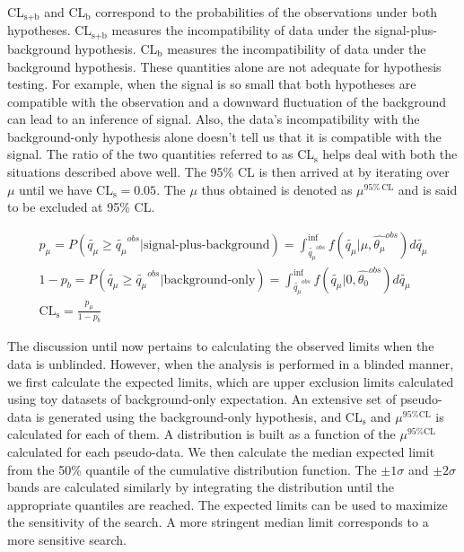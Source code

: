 CL$_\text{s+b}$ and CL$_\text{b}$ correspond to the probabilities of the observations under both hypotheses. CL$_\text{s+b}$ measures the incompatibility of data under the signal-plus-background hypothesis. CL$_\text{b}$ measures the incompatibility of data under the background hypothesis. These quantities alone are not adequate for hypothesis testing. For example, when the signal is so small that both hypotheses are compatible with the observation and a downward fluctuation of the background can lead to an inference of signal. Also, the data's incompatibility with the background-only hypothesis alone doesn't tell us that it is compatible with the signal. The ratio of the two quantities referred to as CL$_\text{s}$ helps deal with both the situations described above well. The 95\% CL is then arrived at by iterating over $\mu$ until we have CL$_\text{s}=0.05$. The $\mu$ thus obtained is denoted as $\mu^{95\% \, \text{CL}}$ and is said to be excluded at 95\% CL.

\begin{gather}
  p_\mu=P(\tilde{q_\mu}\geq \tilde{q_\mu}^{obs}|\text{signal-plus-background})=\int_{\tilde{q_\mu}^{obs}}^{\inf}f(\tilde{q_\mu}|\mu,\hat{\theta_\mu}^{obs})d\tilde{q_\mu} \\
  1-p_b=P(\tilde{q_\mu}\geq \tilde{q_\mu}^{obs}|\text{background-only})=\int_{\tilde{q_\mu}^{obs}}^{\inf}f(\tilde{q_\mu}|0,\hat{\theta_0}^{obs})d\tilde{q_\mu} \\
  \text{CL}_\text{s}=\frac{p_\mu}{1-p_b}
\end{gather}

The discussion until now pertains to calculating the observed limits when the data is unblinded. However, when the analysis is performed in a blinded manner, we first calculate the expected limits, which are upper exclusion limits calculated using toy datasets of background-only expectation. An extensive set of pseudo-data is generated using the background-only hypothesis, and CL$_\text{s}$ and $\mu^{95\%\text{CL}}$ is calculated for each of them. A distribution is built as a function of the $\mu^{95\%\text{CL}}$ calculated for each pseudo-data. We then calculate the median expected limit from the 50\% quantile of the cumulative distribution function. The $\pm 1\sigma$ and $\pm 2\sigma$ bands are calculated similarly by integrating the distribution until the appropriate quantiles are reached. The expected limits can be used to maximize the sensitivity of the search. A more stringent median limit corresponds to a more sensitive search.

